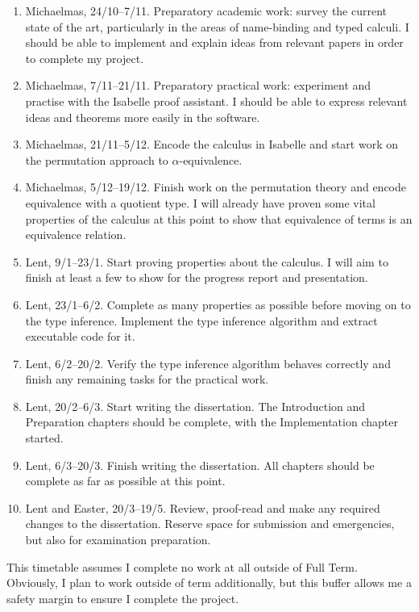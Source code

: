 \documentclass[12pt]{article}
\begin{document}
\begin{enumerate}
\item
Michaelmas, 24/10--7/11.
Preparatory academic work: survey the current state of the art, particularly in the areas of name-binding and typed calculi.
I should be able to implement and explain ideas from relevant papers in order to complete my project.
\item
Michaelmas, 7/11--21/11.
Preparatory practical work: experiment and practise with the Isabelle proof assistant.
I should be able to express relevant ideas and theorems more easily in the software.
\item
Michaelmas, 21/11--5/12.
Encode the calculus in Isabelle and start work on the permutation approach to \(\alpha\)-equivalence.
\item
Michaelmas, 5/12--19/12.
Finish work on the permutation theory and encode equivalence with a quotient type.
I will already have proven some vital properties of the calculus at this point to show that equivalence of terms is an equivalence relation.
\item
Lent, 9/1--23/1.
Start proving properties about the calculus.
I will aim to finish at least a few to show for the progress report and presentation.
\item
Lent, 23/1--6/2.
Complete as many properties as possible before moving on to the type inference.
Implement the type inference algorithm and extract executable code for it.
\item
Lent, 6/2--20/2.
Verify the type inference algorithm behaves correctly and finish any remaining tasks for the practical work.
\item
Lent, 20/2--6/3.
Start writing the dissertation.
The Introduction and Preparation chapters should be complete, with the Implementation chapter started.
\item
Lent, 6/3--20/3.
Finish writing the dissertation.
All chapters should be complete as far as possible at this point.
\item
Lent and Easter, 20/3--19/5.
Review, proof-read and make any required changes to the dissertation.
Reserve space for submission and emergencies,
but also for examination preparation.
\end{enumerate}

This timetable assumes I complete no work at all outside of Full Term. 
Obviously, I plan to work outside of term additionally, but this buffer allows me a safety margin to ensure I complete the project.
\printbibliography
\end{document}
